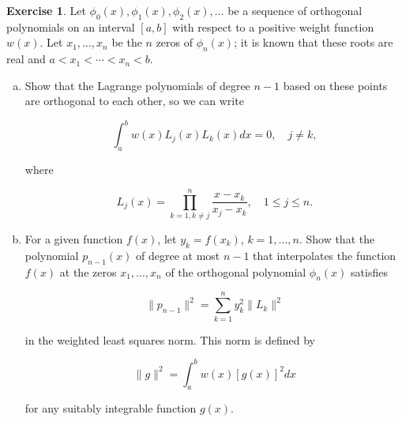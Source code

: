 \documentclass[12pt,a4]{article}
\theoremstyle{definition}
\newtheorem{exercise}{Exercise}
\begin{document}
\begin{exercise}
	Let $\phi_0(x), \phi_1(x), \phi_2(x), \ldots$ be a sequence of orthogonal polynomials on an interval $[a, b]$ with respect to a positive weight function $w(x)$. Let $x_1, \ldots, x_n$ be the $n$ zeros of $\phi_n(x)$; it is known that these roots are real and $a < x_1 < \cdots < x_n < b$.
	
	\begin{enumerate}[(a)]
		\item Show that the Lagrange polynomials of degree $n - 1$ based on these points are orthogonal to each other, so we can write
		
		\[
		\int_a^b w(x) L_j(x) L_k(x) dx = 0 {,} \quad j \neq k {,}
		\]
		
		\noindent where
		
		\[
		L_j(x) = \prod_{k = 1, k \neq j}^{n} \frac{x - x_k}{x_j - x_k} {,} \quad 1 \leq j \leq n {.}
		\]
		
		
		\item For a given function $f(x)$, let $y_k = f (x_k)$, $k = 1, \ldots, n$. Show that the polynomial $p_{n - 1}(x)$ of degree at most $n - 1$ that interpolates the function $f(x)$ at the zeros $x_1, \ldots, x_n$ of the orthogonal polynomial $\phi_n(x)$ satisfies
		
		\[
		\| p_{n - 1} \|^2 = \sum_{k = 1}^n y_k^2 \| L_k \|^2
		\]
		
		\noindent in the weighted least squares norm. This norm is defined by 
		
		\[
		\| g \|^2 = \int_a^b w(x) [g(x)]^2 dx
		\]
		
		\noindent for any suitably integrable function $g(x)$. 
	\end{enumerate}
\end{exercise}
\end{document}
